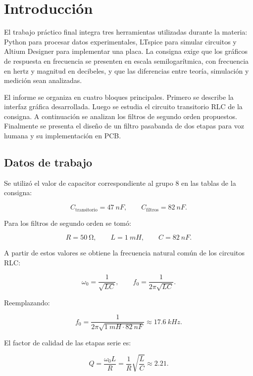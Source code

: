 \section{Introducción}

El trabajo práctico final integra tres herramientas utilizadas durante la materia: Python para procesar datos experimentales, LTspice para simular circuitos y Altium Designer para implementar una placa. La consigna exige que los gráficos de respuesta en frecuencia se presenten en escala semilogarítmica, con frecuencia en hertz y magnitud en decibeles, y que las diferencias entre teoría, simulación y medición sean analizadas.

El informe se organiza en cuatro bloques principales. Primero se describe la interfaz gráfica desarrollada. Luego se estudia el circuito transitorio RLC de la consigna. A continuación se analizan los filtros de segundo orden propuestos. Finalmente se presenta el diseño de un filtro pasabanda de dos etapas para voz humana y su implementación en PCB.

\subsection{Datos de trabajo}

Se utilizó el valor de capacitor correspondiente al grupo 8 en las tablas de la consigna:

\begin{equation}
    C_{\mathrm{transitorio}}=\SI{47}{nF},
    \qquad
    C_{\mathrm{filtros}}=\SI{82}{nF}.
\end{equation}

Para los filtros de segundo orden se tomó:

\begin{equation}
    R=\SI{50}{\ohm}, \qquad L=\SI{1}{mH}, \qquad C=\SI{82}{nF}.
\end{equation}

A partir de estos valores se obtiene la frecuencia natural común de los circuitos RLC:

\begin{equation}
    \omega_0=\frac{1}{\sqrt{LC}},
    \qquad
    f_0=\frac{1}{2\pi\sqrt{LC}}.
\end{equation}

Reemplazando:

\begin{equation}
    f_0=\frac{1}{2\pi\sqrt{\SI{1}{mH}\cdot \SI{82}{nF}}}
    \approx \SI{17.6}{kHz}.
\end{equation}

El factor de calidad de las etapas serie es:

\begin{equation}
    Q=\frac{\omega_0 L}{R}=\frac{1}{R}\sqrt{\frac{L}{C}}
    \approx 2.21.
\end{equation}
